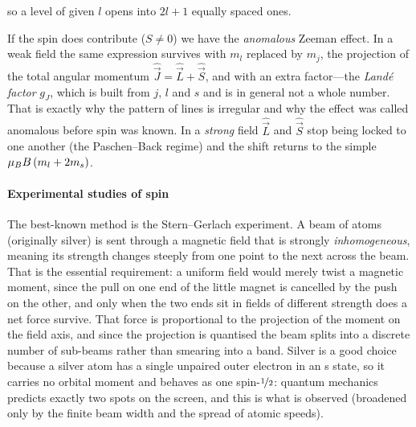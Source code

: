         so a level of given $l$ opens into $2l+1$ equally spaced ones.

        If the spin does contribute ($S\neq0$) we have the \emph{anomalous} Zeeman effect. In a weak field the same expression survives with $m_l$ replaced by $m_j$, the projection of the total angular momentum $\hat{\vec{J}} = \hat{\vec{L}} + \hat{\vec{S}}$, and with an extra factor---the \emph{Land\'e factor} $g_J$, which is built from $j$, $l$ and $s$ and is in general not a whole number. That is exactly why the pattern of lines is irregular and why the effect was called anomalous before spin was known. In a \emph{strong} field $\hat{\vec{L}}$ and $\hat{\vec{S}}$ stop being locked to one another (the Paschen--Back regime) and the shift returns to the simple $\mu_{B} B\,(m_l + 2m_s)$.

    \paragraph{Experimental studies of spin}

        The best-known method is the Stern--Gerlach experiment. A beam of atoms (originally silver) is sent through a magnetic field that is strongly \emph{inhomogeneous}, meaning its strength changes steeply from one point to the next across the beam. That is the essential requirement: a uniform field would merely twist a magnetic moment, since the pull on one end of the little magnet is cancelled by the push on the other, and only when the two ends sit in fields of different strength does a net force survive. That force is proportional to the projection of the moment on the field axis, and since the projection is quantised the beam splits into a discrete number of sub-beams rather than smearing into a band. Silver is a good choice because a silver atom has a single unpaired outer electron in an s state, so it carries no orbital moment and behaves as one spin-$\nicefrac{1}{2}$: quantum mechanics predicts exactly two spots on the screen, and this is what is observed (broadened only by the finite beam width and the spread of atomic speeds).

